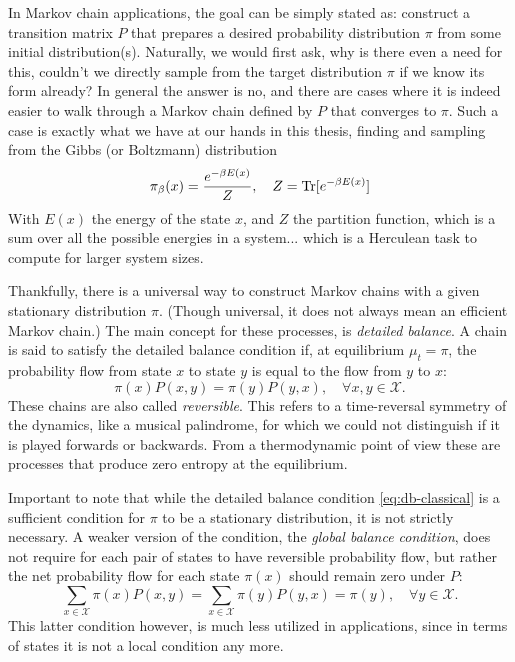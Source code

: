 In Markov chain applications, the goal can be simply stated as: construct a transition matrix $P$ that prepares a desired probability distribution $\pi$ from some initial distribution(s). Naturally, we would first ask, why is there even a need for this, couldn't we directly sample from the target distribution $\pi$ if we know its form already?
In general the answer is no, and there are cases where it is indeed easier to walk through a Markov chain defined by $P$ that converges to $\pi$. Such a case is exactly what we have at our hands in this thesis, finding and sampling from the Gibbs (or Boltzmann) distribution
\begin{equation}
    \label{eq:cl-gibbs}
    \pi_\beta(x) = \frac{e^{-\beta E(x)}}{Z}, \quad  Z = \operatorname{Tr} [e^{-\beta E(x)}]
\end{equation}
With $E(x)$ the energy of the state $x$, and $Z$ the partition function, which is a sum over all the possible energies in a system... which is a Herculean task to compute for larger system sizes.

Thankfully, there is a universal way to construct Markov chains with a given stationary distribution $\pi$. (Though universal, it does not always mean an efficient Markov chain.) The main concept for these processes, is \textit{detailed balance}. A chain is said to satisfy the detailed balance condition if, at equilibrium $\mu_t = \pi$, the probability flow from state $x$ to state $y$ is equal to the flow from $y$ to $x$:
\begin{equation}
    \label{eq:db-classical}
    \pi(x) P(x, y) = \pi(y) P(y, x), \quad\forall x, y\in\mathcal{X}.
\end{equation}
These chains are also called \textit{reversible}. This refers to a time-reversal symmetry of the dynamics, like a musical palindrome, for which we could not distinguish if it is played forwards or backwards. From a thermodynamic point of view these are processes that produce zero entropy at the equilibrium.

Important to note that while the detailed balance condition \eqref{eq:db-classical} is a sufficient condition for $\pi$ to be a stationary distribution, it is not strictly necessary. A weaker version of the condition, the \textit{global balance condition}, does not require for each pair of states to have reversible probability flow, but rather the net probability flow for each state $\pi(x)$ should remain zero under $P$:
\begin{equation}
    \sum_{x\in\mathcal{X}} \pi(x) P(x, y) = \sum_{x\in\mathcal{X}} \pi(y) P(y, x) = \pi(y),\quad\forall y\in\mathcal{X}.
\end{equation}
This latter condition however, is much less utilized in applications, since in terms of states it is not a local condition any more.

